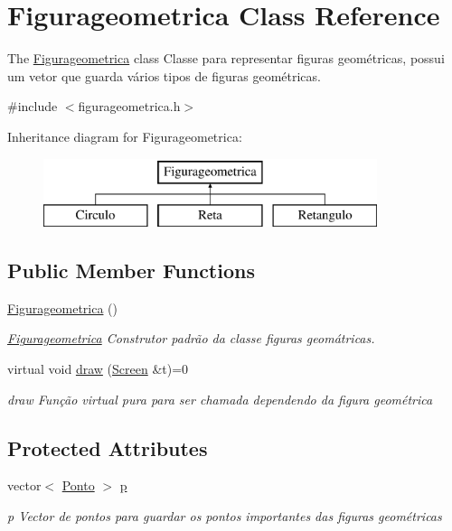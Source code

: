 \hypertarget{class_figurageometrica}{}\section{Figurageometrica Class Reference}
\label{class_figurageometrica}


The \mbox{\hyperlink{class_figurageometrica}{Figurageometrica}} class Classe para representar figuras geométricas, possui um vetor que guarda vários tipos de figuras geométricas.  




{\ttfamily \#include $<$figurageometrica.\+h$>$}

Inheritance diagram for Figurageometrica\+:\begin{figure}[H]
\begin{center}
\leavevmode
\includegraphics[height=2.000000cm]{class_figurageometrica}
\end{center}
\end{figure}
\subsection*{Public Member Functions}
\begin{DoxyCompactItemize}
\item 
\mbox{\hyperlink{class_figurageometrica_aaa6a63e714e6ee3e884d17a5151b1ec4}{Figurageometrica}} ()
\begin{DoxyCompactList}\small\item\em \mbox{\hyperlink{class_figurageometrica}{Figurageometrica}} Construtor padrão da classe figuras geomátricas. \end{DoxyCompactList}\item 
virtual void \mbox{\hyperlink{class_figurageometrica_a68d9aba508879bb7a9ea1fe9d1d4f5f4}{draw}} (\mbox{\hyperlink{class_screen}{Screen}} \&t)=0
\begin{DoxyCompactList}\small\item\em draw Função virtual pura para ser chamada dependendo da figura geométrica \end{DoxyCompactList}\end{DoxyCompactItemize}
\subsection*{Protected Attributes}
\begin{DoxyCompactItemize}
\item 
vector$<$ \mbox{\hyperlink{class_ponto}{Ponto}} $>$ \mbox{\hyperlink{class_figurageometrica_a7fe8a9843c286befdf0b96871d6e0a4b}{p}}
\begin{DoxyCompactList}\small\item\em p Vector de pontos para guardar os pontos importantes das figuras geométricas \end{DoxyCompactList}\end{DoxyCompactItemize}


